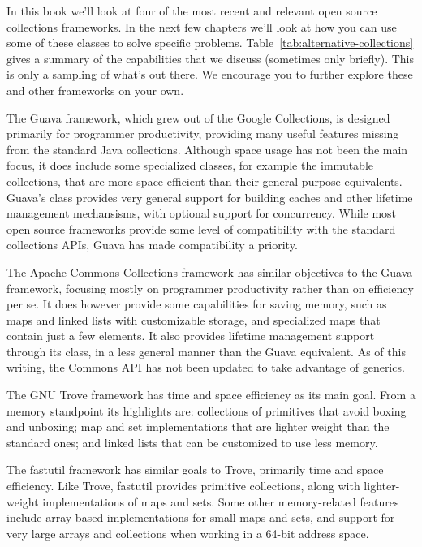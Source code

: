 In this book we'll look at four of the most recent and relevant
open source collections frameworks. In the next few chapters we'll look at how
you can use some of these classes to solve specific problems.
Table~\ref{tab:alternative-collections} gives a summary of the capabilities that
we discuss (sometimes only briefly). This is only a sampling of what's out
there. We encourage you to further explore these and other frameworks on your own.

The Guava framework, which grew out of the Google Collections, is
designed primarily for programmer productivity, providing many useful
features missing from the standard Java collections. 
Although space usage has not been the main focus, it does include some
specialized classes, for example the immutable collections, that are more
space-efficient than their general-purpose equivalents. Guava's 
class provides very general support for 
building caches and other lifetime management mechansisms, with optional support
for concurrency. While most open source frameworks provide some level of compatibility with the
standard collections APIs, Guava has made compatibility a priority.

The Apache Commons Collections framework has similar objectives to the Guava
framework, focusing mostly on programmer productivity rather than on
efficiency per se. 
It does however provide some capabilities for saving memory, such as
maps and linked lists with customizable storage, and specialized 
maps that contain just a few elements. It also provides lifetime management
support through its  class, in a less general
manner than the Guava equivalent. As of this writing,
the Commons API has not been updated to take advantage of generics.

The GNU Trove framework has time and space efficiency as its main goal.
From a memory standpoint its highlights are: collections of primitives that
avoid boxing and unboxing;  map
and set implementations that are lighter weight than the standard ones; and
linked lists that can be customized to use less memory.

The fastutil framework has similar goals to Trove, primarily time and space
efficiency. Like Trove, fastutil provides primitive collections, along with
lighter-weight implementations of maps and sets. Some other memory-related
features include array-based implementations for small
maps and sets, and support for very large arrays and collections when working
in a 64-bit address space.

